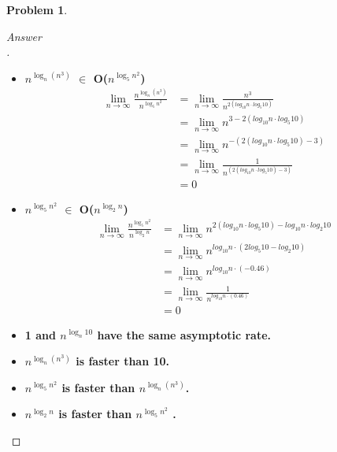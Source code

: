 \documentclass[11pt]{article}
\theoremstyle{definition}
\theoremstyle{definition}
\newtheorem{required}{Problem}
\theoremstyle{definition}
\begin{document}
\begin{required}
\begin{enumerate}[label=(\alph*)]
\begin{proof}[Answer\\]
\begin{itemize}
\item \textbf{$n^{\log_n(n^3)}$ $\in$ O($n^{\log_5 n^2}$)}
\begin{align*}
\lim_{n \to \infty} \frac {n^{\log_n(n^3)}}{n^{\log_5 n^2}} 
&= \lim_{n \to \infty} \frac {n^{3} }{n^{2(log_{10} n\cdot log_5 10)}}\\
&= \lim_{n \to \infty} n^{3 - 2(log_{10} n\cdot log_5 10) }\\
&= \lim_{n \to \infty} n^{-(2(log_{10} n\cdot log_5 10)-3) }\\
&= \lim_{n \to \infty} \frac {1}{n^{(2(log_{10} n\cdot log_5 10)-3) }}\\
&= 0
\end{align*}

\item \textbf{$n^{\log_5 n^2}$ $\in$ O($n^{\log_2 n}$)}
\begin{align*}
\lim_{n \to \infty} \frac {n^{\log_5 n^2}}{n^{\log_2 n}} &= \lim_{n \to \infty} n^{2(log_{10} n\cdot log_5 10) - log_{10} n \cdot log_2 10}\\
&= \lim_{n \to \infty} n^{log_{10}n \cdot (2log_5 10 - log_2 10)}\\
&= \lim_{n \to \infty} n^{log_{10}n \cdot (-0.46)}\\
&= \lim_{n \to \infty} \frac{1}{n^{log_{10} n \cdot (0.46)}}\\
&= 0
\end{align*}
\item \textbf{1 and $n^{\log_n 10}$ have the same asymptotic rate.}
\item \textbf{$n^{\log_n(n^3)}$ is faster than 10.}
\item \textbf{$n^{\log_5 n^2}$ is faster than $n^{\log_n(n^3)}$.}
\item \textbf{$n^{\log_2 n}$ is faster than $n^{\log_5 n^2}$ .}



\end{itemize}
        \end{proof}
        \newpage

\end{enumerate}
\end{required}
\end{document}
